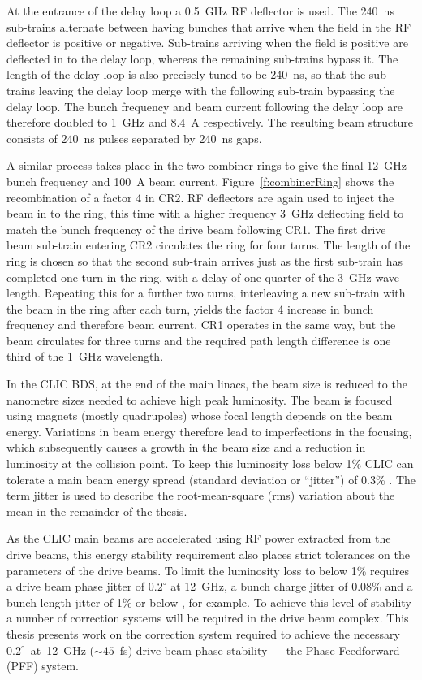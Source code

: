 At the entrance of the delay loop a 0.5~GHz RF deflector is used. The 240~ns sub-trains alternate between having bunches that arrive when the field in the RF deflector is positive or negative. Sub-trains arriving when the field is positive are deflected in to the delay loop, whereas the remaining sub-trains bypass it. The length of the delay loop is also precisely tuned to be 240~ns, so that the sub-trains leaving the delay loop merge with the following sub-train bypassing the delay loop. The bunch frequency and beam current following the delay loop are therefore doubled to 1~GHz and 8.4~A respectively. The resulting beam structure consists of 240~ns pulses separated by 240~ns gaps.

A similar process takes place in the two combiner rings to give the final 12~GHz bunch frequency and 100~A beam current. Figure~\ref{f:combinerRing} shows the recombination of a factor 4 in CR2. RF deflectors are again used to inject the beam in to the ring, this time with a higher frequency 3~GHz deflecting field to match the bunch frequency of the drive beam following CR1. The first drive beam sub-train entering CR2 circulates the ring for four turns. The length of the ring is chosen so that the second sub-train arrives just as the first sub-train has completed one turn in the ring, with a delay of one quarter of the 3~GHz wave length. Repeating this for a further two turns, interleaving a new sub-train with the beam in the ring after each turn, yields the factor 4 increase in bunch frequency and therefore beam current. CR1 operates in the same way, but the beam circulates for three turns and the required path length difference is one third of the 1~GHz wavelength.


In the CLIC BDS, at the end of the main linacs, the beam size is reduced to the nanometre sizes needed to achieve high peak luminosity. The beam is focused using magnets (mostly quadrupoles) whose focal length depends on the beam energy. Variations in beam energy therefore lead to imperfections in the focusing, which subsequently causes a growth in the beam size and a reduction in luminosity at the collision point. To keep this luminosity loss below 1\% CLIC can tolerate a main beam energy spread (standard deviation or ``jitter'') of 0.3\% \cite{clicCDR}. The term jitter is used to describe the root-mean-square (rms) variation about the mean in the remainder of the thesis. 

As the CLIC main beams are accelerated using RF power extracted from the drive beams, this energy stability requirement also places strict tolerances on the parameters of the drive beams. To limit the luminosity loss to below 1\% requires a drive beam phase jitter of \(0.2^\circ\) at 12~GHz, a bunch charge jitter of 0.08\% and a bunch length jitter of 1\% or below \cite{clicStabReq}, for example. To achieve this level of stability a number of correction systems will be required in the drive beam complex. This thesis presents work on the correction system required to achieve the necessary \(0.2^\circ\)~at~12~GHz (\(\sim45\)~fs) drive beam phase stability --- the Phase Feedforward (PFF) system.


